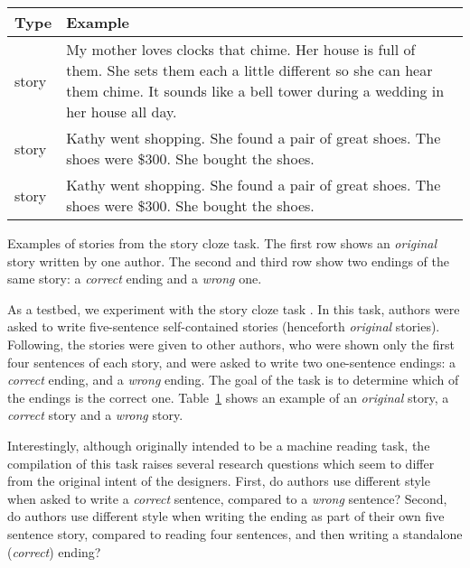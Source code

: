 \documentclass[11pt,a4paper]{article}
\newcommand{\tabref}[1]{Table~\ref{#1}}
\begin{document}
\begin{table}[!t]
\begin{tabular}{|p{1.3cm}|p{5.6cm}|} \hline
{\bf Type} & {\bf Example} \\ \hline
{\color{blue}{\it Original}} story & My mother loves clocks that chime.	Her house is full of them.	She sets them each a little different so she can hear them chime.	It sounds like a bell tower during a wedding in her house all day.	{\color{blue}{When I visit I stop them or I'd never be able to sleep at night.}} \\ \hline
{\color{forestgreen}{\it Correct}} story & Kathy went shopping.	She found a pair of great shoes.	The shoes were \$300.	She bought the shoes.	{\color{forestgreen}{She felt buyer's remorse after the purchase.}} \\ \hline
{\color{red}{\it Wrong}} story & Kathy went shopping.	She found a pair of great shoes.	The shoes were \$300.	She bought the shoes.	{\color{red}{Kathy hated buying shoes.}} \\ \hline
\end{tabular}
\caption{\label{ROC-example}}
Examples of stories from the story cloze task. The first row shows an {\it original} story written by one author. 
The second and third row show two endings of the same story: a {\it correct} ending and a {\it wrong} one.
\end{table}


As a testbed, we experiment with the story cloze task \cite{Mostafazadeh:2016}. 
In this task, authors were asked to write five-sentence self-contained stories (henceforth {\it original} stories).
Following, the stories were given to other authors, who were shown only the first four sentences of each story, 
and were asked to write two one-sentence endings: a {\it correct} ending, and a {\it wrong} ending.
The goal of the task is to determine which of the endings is the correct one.
\tabref{ROC-example} shows an example of an {\it original} story, a {\it correct} story and a {\it wrong} story.

Interestingly, although originally intended to be a machine reading task, the compilation of this task raises several research questions which seem to differ from the original intent of the designers.
First, do authors use different style when asked to write a {\it correct} sentence, compared to a {\it wrong} sentence?
Second, do authors use different style when writing the ending as part of their own five sentence story, compared to reading four sentences, and then writing a standalone ({\it correct}) ending?
\end{document}
